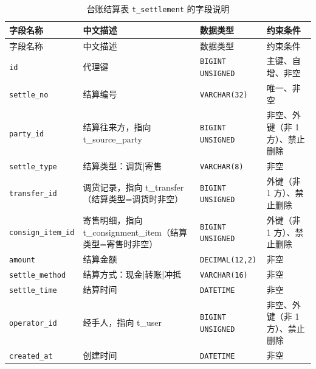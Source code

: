 \documentclass[12pt, a4paper]{ctexart}
\newcommand{\code}[1]{\texttt{\small #1}}
\begin{document}
\begin{longtable}{@{}p{3.1cm} p{4.5cm} p{2.4cm} p{4.5cm}@{}}
\caption{台账结算表 \code{t\_settlement} 的字段说明}\label{tab:f-t-settlement}\\
\toprule
字段名称 & 中文描述 & 数据类型 & 约束条件 \\
\midrule
\endfirsthead
\toprule
字段名称 & 中文描述 & 数据类型 & 约束条件 \\
\midrule
\endhead
\bottomrule
\endlastfoot
\code{id} & 代理键 & \code{BIGINT UNSIGNED} & 主键、自增、非空 \\
\code{settle\_no} & 结算编号 & \code{VARCHAR(32)} & 唯一、非空 \\
\code{party\_id} & 结算往来方，指向 t\_source\_party & \code{BIGINT UNSIGNED} & 非空、外键（非 1 方）、禁止删除 \\
\code{settle\_type} & 结算类型：调货|寄售 & \code{VARCHAR(8)} & 非空 \\
\code{transfer\_id} & 调货记录，指向 t\_transfer（结算类型=调货时非空） & \code{BIGINT UNSIGNED} & 外键（非 1 方）、禁止删除 \\
\code{consign\_item\_id} & 寄售明细，指向 t\_consignment\_item（结算类型=寄售时非空） & \code{BIGINT UNSIGNED} & 外键（非 1 方）、禁止删除 \\
\code{amount} & 结算金额 & \code{DECIMAL(12,2)} & 非空 \\
\code{settle\_method} & 结算方式：现金|转账|冲抵 & \code{VARCHAR(16)} & 非空 \\
\code{settle\_time} & 结算时间 & \code{DATETIME} & 非空 \\
\code{operator\_id} & 经手人，指向 t\_user & \code{BIGINT UNSIGNED} & 非空、外键（非 1 方）、禁止删除 \\
\code{created\_at} & 创建时间 & \code{DATETIME} & 非空 \\
\end{longtable}
\end{document}
